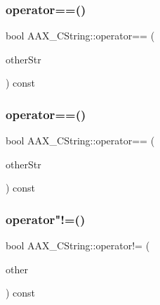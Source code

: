 \subsubsection{\texorpdfstring{operator==()}{operator==()}\hspace{0.1cm}{\footnotesize\ttfamily [2/3]}}
{\footnotesize\ttfamily bool A\+A\+X\+\_\+\+C\+String\+::operator== (\begin{DoxyParamCaption}\item[{const char $\ast$}]{other\+Str }\end{DoxyParamCaption}) const}

\mbox{\label{a01573_ad2d8d5ba1b4c09b6f1c262e4d8d5fb2c}} 
\subsubsection{\texorpdfstring{operator==()}{operator==()}\hspace{0.1cm}{\footnotesize\ttfamily [3/3]}}
{\footnotesize\ttfamily bool A\+A\+X\+\_\+\+C\+String\+::operator== (\begin{DoxyParamCaption}\item[{const std\+::string \&}]{other\+Str }\end{DoxyParamCaption}) const}

\mbox{\label{a01573_aceeeba7d93fd16a8d1296726950f3ead}} 
\subsubsection{\texorpdfstring{operator"!=()}{operator!=()}\hspace{0.1cm}{\footnotesize\ttfamily [1/3]}}
{\footnotesize\ttfamily bool A\+A\+X\+\_\+\+C\+String\+::operator!= (\begin{DoxyParamCaption}\item[{const \mbox{\hyperlink{a01573}{A\+A\+X\+\_\+\+C\+String}} \&}]{other }\end{DoxyParamCaption}) const}

\mbox{\label{a01573_a6bd52b08f5895a320ef561117940f121}} 
